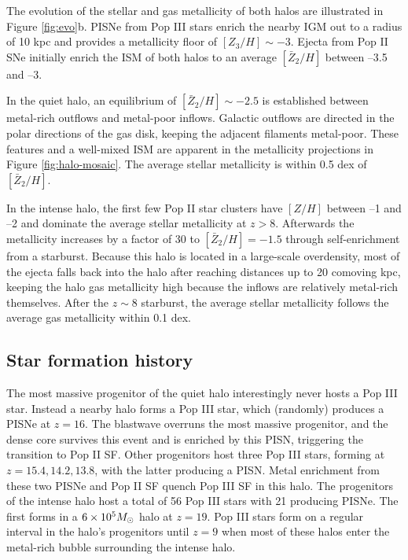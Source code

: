 \documentclass[apjl]{emulateapj}
\begin{document}
The evolution of the stellar and gas metallicity of both halos are
illustrated in Figure \ref{fig:evo}b.  PISNe from Pop III stars enrich
the nearby IGM out to a radius of 10 kpc and provides a metallicity
floor of $[Z_3/H] \sim -3$.  Ejecta from Pop II SNe initially enrich
the ISM of both halos to an average $[\bar{Z}_2/H]$ between --3.5 and
--3.

In the quiet halo, an equilibrium of $[\bar{Z}_2/H] \sim -2.5$ is
established between metal-rich outflows and metal-poor inflows.
Galactic outflows are directed in the polar directions of the gas
disk, keeping the adjacent filaments metal-poor.  These features and a
well-mixed ISM \citep[cf.][]{Wise08_Gal, Greif10} are apparent in the
metallicity projections in Figure \ref{fig:halo-mosaic}.  The average
stellar metallicity is within 0.5 dex of $[\bar{Z}_2/H]$.

In the intense halo, the first few Pop II star clusters have $[Z/H]$
between --1 and --2 and dominate the average stellar metallicity at $z
> 8$.  Afterwards the metallicity increases by a factor of 30 to
$[\bar{Z}_2/H] = -1.5$ through self-enrichment from a starburst.
Because this halo is located in a large-scale overdensity, most of the
ejecta falls back into the halo after reaching distances up to 20
comoving kpc, keeping the halo gas metallicity high because the
inflows are relatively metal-rich themselves.  After the $z \sim 8$
starburst, the average stellar metallicity follows the average gas
metallicity within 0.1 dex.

\subsection{Star formation history}
\label{sec:pop}

The most massive progenitor of the quiet halo interestingly never
hosts a Pop III star.  Instead a nearby halo forms a Pop III star,
which (randomly) produces a PISNe at $z=16$.  The blastwave overruns
the most massive progenitor, and the dense core survives this event
and is enriched by this PISN, triggering the transition to Pop II SF.
Other progenitors host three Pop III stars, forming at $z = 15.4,
14.2, 13.8$, with the latter producing a PISN.  Metal enrichment from
these two PISNe and Pop II SF quench Pop III SF in this halo.  The
progenitors of the intense halo host a total of 56 Pop III stars with
21 producing PISNe.  The first forms in a $6 \times 10^5 \Ms$ halo at
$z=19$.  Pop III stars form on a regular interval in the halo's
progenitors until $z=9$ when most of these halos enter the metal-rich
bubble surrounding the intense halo.
\end{document}

